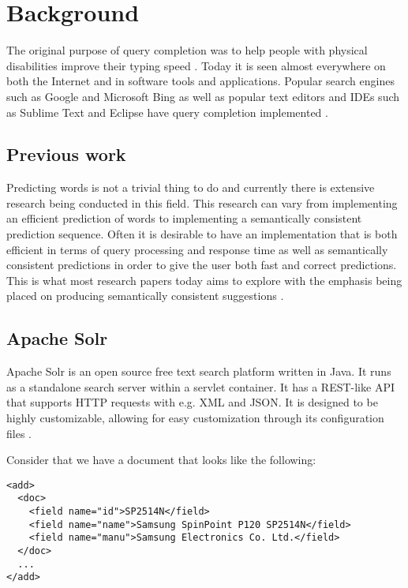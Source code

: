 \section{Background}\label{background}

The original purpose of query completion was to help people with physical disabilities improve their typing speed \cite{TAM}. Today it is seen almost everywhere on both the Internet and in software tools and applications. Popular search engines such as Google and Microsoft Bing \cite{GOOG, BING} as well as popular text editors and IDEs such as Sublime Text and Eclipse have query completion implemented \cite{ECLIPSE, SUBLIME}.

\subsection{Previous work}\label{previouswork}

Predicting words is not a trivial thing to do and currently there is extensive research being conducted in this field. This research can vary from implementing an efficient prediction of words to implementing a semantically consistent prediction sequence. Often it is desirable to have an implementation that is both efficient in terms of query processing and response time as well as semantically consistent predictions in order to give the user both fast and correct predictions. This is what most research papers today aims to explore with the emphasis being placed on producing semantically consistent suggestions \cite{MEI, CUCERZAN}. 

\subsection{Apache Solr}

Apache Solr is an open source free text search platform written in Java. It runs as a standalone search server within a servlet container. It has a REST-like API that supports HTTP requests with e.g. XML and JSON. It is designed to be highly customizable, allowing for easy customization through its configuration files \cite{SOLR}.

Consider that we have a document that looks like the following:

\begin{verbatim}
<add>
  <doc>
    <field name="id">SP2514N</field>
    <field name="name">Samsung SpinPoint P120 SP2514N</field>
    <field name="manu">Samsung Electronics Co. Ltd.</field>
  </doc>
  ...
</add>
\end{verbatim}

